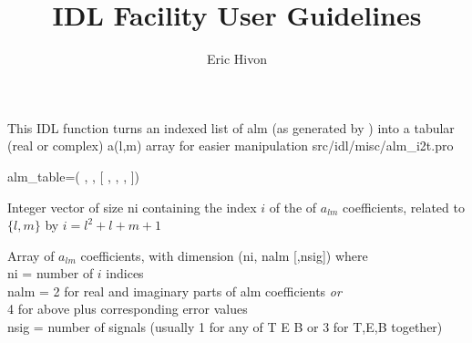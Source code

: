

\sloppy

\title{\healpix IDL Facility User Guidelines}
 \section[alm\_i2t]{ }
\label{idl:alm_i2t}
\author{Eric Hivon}

\begin{facility}
{This IDL function turns an indexed list of alm (as generated by
) into a tabular (real or complex) a(l,m) array for easier manipulation%
}
{src/idl/misc/alm\_i2t.pro}
\end{facility}

\begin{IDLformat}
{%
{alm\_table}=\thedocid(%
, 
,
[%
,
,
,
%
])}
\end{IDLformat}

\begin{qualifiers}
  \begin{qulist}{} %
    \item[Index] 
Integer vector of size ni containing the index $i$ of the 
            of $a_{lm}$ coefficients, related to $\{l,m\}$ by 
             $i = l^2 + l + m + 1$
    \item[Alm\_vec] %
Array of $a_{lm}$ coefficients, with dimension (ni, nalm [,nsig])
     where\\
           ni   = number of $i$ indices\\
           nalm = 2 for real and imaginary parts of alm coefficients {\em or}\\
                  4 for above plus corresponding error values\\
           nsig = number of signals (usually 1 for any of T E B
                  or 3 for T,E,B together)
\end{qulist}
\end{qualifiers}

